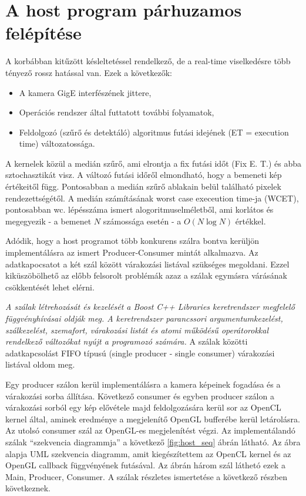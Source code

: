 \section{A host program párhuzamos felépítése} \label{sec:parallel}
	A korbábban kitűzött késleltetéssel rendelkező, de a real-time viselkedésre több tényező rossz hatással van.
	Ezek a következők:
	\begin{itemize}
	  \item A kamera GigE interfészének jittere,
	  \item Operációs rendszer által futtatott további folyamatok,
	  \item Feldolgozó (szűrő és detektáló) algoritmus futási idejének (ET = execution time) változatossága. 
	\end{itemize}
	A kernelek közül a medián szűrő, ami elrontja a fix futási időt (Fix E. T.) és abba sztochasztikát visz.
	A változó futási időről elmondható, hogy a bemeneti kép értékeitől függ. Pontosabban a medián szűrő ablakain belül található
	pixelek rendezettségétől.
	A medián számításának worst case execeution time-ja (WCET), pontosabban wc. lépésszáma ismert alogoritmuselméletből, ami korlátos
	és megegyezik - a bemenet $N$ számossága esetén - a $O(N \log N)$  értékkel.
	
	Adódik, hogy a host programot több konkurens szálra bontva kerüljön implementálásra az ismert Producer-Consumer
	\cite{EWD:EWD329pub} mintát alkalmazva. Az adatkapocsatot a két szál között várakozási listával szükséges megoldani. 
	Ezzel kiküszöbölhető az előbb felsorolt problémák azaz a szálak egymásra várásának csökkentését lehet elérni.
	
	\cbstart \textit{
	A szálak létrehozását és kezelését a \textit{Boost C++ Libraries} \cite{boost} keretrendszer
	megfelelő függvényhívásai oldják meg. A keretrendszer parancssori argumentumkezelést, szálkezelést, szemafort, várakozási
	listát és atomi működésű operátorokkal rendelkező változókat nyújt a programozó számára.
	} \cbend
	A szálak közötti adatkapcsolást FIFO típusú (single producer - single consumer) várakozási listával oldom meg.
	
	Egy producer szálon kerül implementálásra a kamera képeinek fogadása és a várakozási sorba állítása. Következő consumer
	és egyben producer szálon a várakozási sorból egy kép elővétele majd feldolgozására kerül sor az OpenCL kernel által, aminek
	eredménye a megjelenítő OpenGL bufferébe kerül letárolásra. Az utolsó consumer szál az OpenGL-es megjelenítést végzi.
	Az implementálandó szálak ``szekvencia diagrammja'' a következő \ref{fig:host_seq} ábrán látható.
	Az ábra alapja UML szekvencia diagramm, amit kiegészítettem az OpenCL kernel
	és az OpenGL callback függvényének futásával. Az ábrán három szál láthetó ezek a Main, Producer, Consumer.
	A szálak részletes ismertetése a következő részben következnek.
	\newpage
	 
